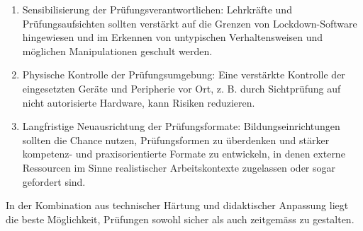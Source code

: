 \documentclass[14pt]{article}
\begin{document}
\begin{enumerate}
\item Sensibilisierung der Prüfungsverantwortlichen: Lehrkräfte und Prüfungsaufsichten sollten verstärkt auf die Grenzen von Lockdown-Software hingewiesen und im Erkennen von untypischen Verhaltensweisen und möglichen Manipulationen geschult werden.

\item Physische Kontrolle der Prüfungsumgebung: Eine verstärkte Kontrolle der eingesetzten Geräte und Peripherie vor Ort, z. B. durch Sichtprüfung auf nicht autorisierte Hardware, kann Risiken reduzieren.

\item Langfristige Neuausrichtung der Prüfungsformate: Bildungseinrichtungen sollten die Chance nutzen, Prüfungsformen zu überdenken und stärker kompetenz- und praxisorientierte Formate zu entwickeln, in denen externe Ressourcen im Sinne realistischer Arbeitskontexte zugelassen oder sogar gefordert sind.

\end{enumerate}

In der Kombination aus technischer Härtung und didaktischer Anpassung liegt die beste Möglichkeit, Prüfungen sowohl sicher als auch zeitgemäss zu gestalten.
\end{document}
